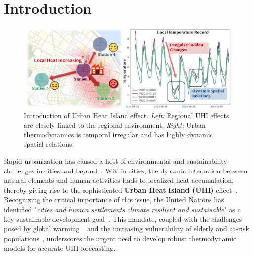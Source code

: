 
\section{Introduction}
\label{sec:intro}

\begin{figure}[t!]
    \centering
    \includegraphics[width=1.0\linewidth]{resources/intro_1.pdf}
    \vspace{-1em}
    \caption{Introduction of Urban Heat Island effect. \textit{Left:}  Regional UHI effects are closely linked to the regional environment. \textit{Right:} Urban thermodynamics is temporal irregular and has highly dynamic spatial relations.}
    \label{fig:intro_data}
    \vspace{-1.5em}
\end{figure}

Rapid urbanization has caused a host of environmental and sustainability challenges in cities and beyond~\cite{krupat1985people,keivani2009review,zheng2014urban,wen2023diffstg,zou2024learning,zou2025deep}. Within cities, the dynamic interaction between natural elements and human activities leads to localized heat accumulation, thereby giving rise to the sophisticated \textbf{Urban Heat Island (UHI)} effect~\cite{lyu2022integrated,yoo2018investigating,li2019urban}. 
Recognizing the critical importance of this issue, the United Nations has identified "\textit{cities and human settlements climate resilient and sustainable}" as a key sustainable development goal~\cite{lu2015policy}. This mandate, coupled with the challenges posed by global warming ~\cite{alcoforado2008global,santamouris2014energy,santamouris2015impact} and the increasing vulnerability of elderly and at-risk populations~\cite{zhu2023urban,park2021differing,heaviside2017urban}, underscores the urgent need to develop robust thermodynamic models for accurate UHI forecasting.


